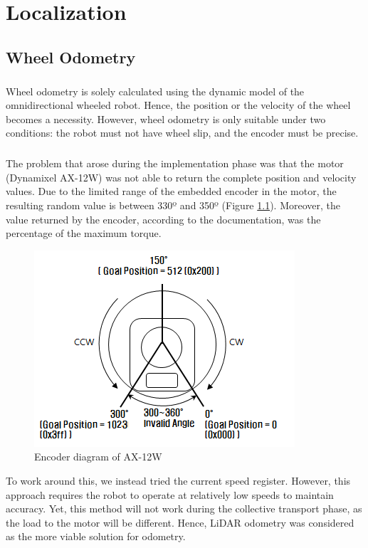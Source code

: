 \chapter{Localization}

\section*{Wheel Odometry}
\paragraph*{}
\quad Wheel odometry is solely calculated using the dynamic model of the omnidirectional wheeled robot. Hence, the position or the velocity of the wheel becomes a necessity. However, wheel odometry is only suitable under two conditions: the robot must not have wheel slip, and the encoder must be precise. 
\paragraph*{}
The problem that arose during the implementation phase was that the motor (Dynamixel AX-12W) was not able to return the complete position and velocity values. Due to the limited range of the embedded encoder in the motor, the resulting random value is between 330º and 350º (Figure \ref{fig:goal-position}). Moreover, the value returned by the encoder, according to the documentation, was the percentage of the maximum torque. \cite{robotisAX12W} 

\begin{figure}[H]
    \centering
    \includegraphics[width=0.35\linewidth]{assets/images/odometry/goal_position.png}
    \caption{Encoder diagram of AX-12W}
    \label{fig:goal-position}
\end{figure}

To work around this, we instead tried the current speed register. However, this approach requires the robot to operate at relatively low speeds to maintain accuracy. Yet, this method will not work during the collective transport phase, as the load to the motor will be different. Hence, LiDAR odometry was considered as the more viable solution for odometry.

